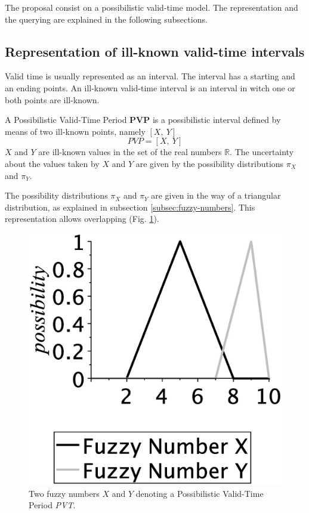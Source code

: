 The proposal consist on a possibilistic valid-time model. The representation and the querying are explained in the following subsections.

\subsection{Representation of ill-known valid-time intervals}
Valid time is usually represented as an interval. The interval has a starting and an ending points. An ill-known valid-time interval is an interval in witch one or both points are ill-known. 

\begin{definition}
A Possibilistic Valid-Time Period \textbf{PVP} is a possibilistic interval defined by means of two ill-known points, namely $\left[ X,\ Y \right]$
\begin{equation}
PVP = \left[X,\ Y \right] 
\end{equation}
$X$ and $Y$ are ill-known values in the set of the real numbers $\mathbb{R}$. The uncertainty about the values taken by $X$ and $Y$ are given by the possibility distributions $\pi_X$ and $\pi_Y$.
\end{definition}

The possibility distributions $\pi_X$ and $\pi_Y$ are given in the way of a triangular distribution, as explained in subsection \ref{subsec:fuzzy-numbers}. This representation allows overlapping (Fig. \ref{fig:pvp}).


\begin{figure}[h!]
  \centering
  \includegraphics[scale=0.2]{graphs/2_triangular.eps}
  \caption{Two fuzzy numbers $X$ and $Y$ denoting a Possibilistic Valid-Time Period \emph{PVT}.}
  \label{fig:pvp}
\end{figure}

